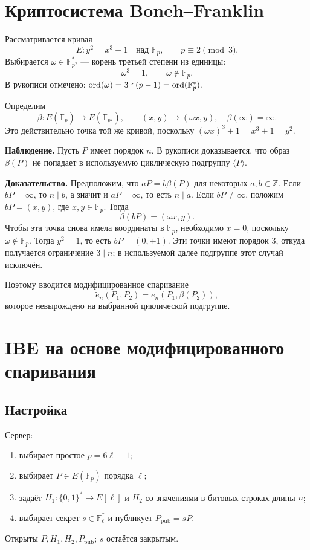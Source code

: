 \documentclass[12pt,a4paper]{article}
\newcommand{\Z}{\mathbb Z}\newcommand{\F}{\mathbb F}\newcommand{\Kbar}{\overline K}
\begin{document}
\section{Криптосистема Boneh--Franklin}
Рассматривается кривая
\[E:y^2=x^3+1\quad\text{над }\F_p,\qquad p\equiv2\pmod3.\]
Выбирается $\omega\in\F_{p^2}^*$ --- корень третьей степени из единицы:
\[\omega^3=1,\qquad\omega\notin\F_p.\]
В рукописи отмечено: $\ord(\omega)=3\nmid(p-1)=\ord(\F_p^*)$.

Определим
\[\beta:E(\F_p)\to E(\F_{p^2}),\qquad (x,y)\mapsto(\omega x,y),\quad \beta(\infty)=\infty.\]
Это действительно точка той же кривой, поскольку $(\omega x)^3+1=x^3+1=y^2$.

\textbf{Наблюдение.} Пусть $P$ имеет порядок $n$. В рукописи доказывается, что образ $\beta(P)$ не попадает в используемую циклическую подгруппу $\langle P\rangle$.

\textbf{Доказательство.} Предположим, что $aP=b\beta(P)$ для некоторых $a,b\in\Z$.
Если $bP=\infty$, то $n\mid b$, а значит и $aP=\infty$, то есть $n\mid a$.
Если $bP\ne\infty$, положим $bP=(x,y)$, где $x,y\in\F_p$. Тогда
\[\beta(bP)=(\omega x,y).\]
Чтобы эта точка снова имела координаты в $\F_p$, необходимо $x=0$, поскольку $\omega\notin\F_p$. Тогда $y^2=1$, то есть $bP=(0,\pm1)$. Эти точки имеют порядок $3$, откуда получается ограничение $3\mid n$; в используемой далее подгруппе этот случай исключён.

Поэтому вводится модифицированное спаривание
\[\widetilde e_n(P_1,P_2)=e_n(P_1,\beta(P_2)),\]
которое невырождено на выбранной циклической подгруппе.

\section{IBE на основе модифицированного спаривания}
\subsection*{Настройка}
Сервер:
\begin{enumerate}[label=\arabic*)]
\item выбирает простое $p=6\ell-1$;
\item выбирает $P\in E(\F_p)$ порядка $\ell$;
\item задаёт $H_1:\{0,1\}^*\to E[\ell]$ и $H_2$ со значениями в битовых строках длины $n$;
\item выбирает секрет $s\in\F_\ell^*$ и публикует $P_{\mathrm{pub}}=sP$.
\end{enumerate}
Открыты $P,H_1,H_2,P_{\mathrm{pub}}$; $s$ остаётся закрытым.
\end{document}
